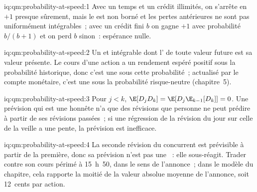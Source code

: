 \begin{solution}{iq:qm:probability-at-speed:1}
Avec un temps et un crédit illimités, on s'arrête en $+1$ presque sûrement, mais le  est
non borné et les pertes antérieures ne sont pas uniformément intégrables~; avec un crédit fini $b$
on gagne $+1$ avec probabilité $b/(b+1)$ et on perd $b$ sinon~: espérance nulle.
\end{solution}

\begin{solution}{iq:qm:probability-at-speed:2}
Un  et intégrable dont l' de toute valeur future est sa
valeur présente. Le cours d'une action a un rendement espéré positif sous la probabilité historique,
donc c'est une  sous cette probabilité~; actualisé par le compte monétaire, c'est une 
sous la probabilité risque-neutre (chapitre~5).
\end{solution}

\begin{solution}{iq:qm:probability-at-speed:3}
Pour $j < k$, $\E[D_jD_k] = \E[D_j\E_{k-1}[D_k]] = 0$. Une prévision qui est une  honnête
n'a que des révisions que personne ne peut prédire à partir de ses révisions passées~; si une régression
de la révision du jour sur celle de la veille a une pente, la prévision est inefficace.
\end{solution}

\begin{solution}{iq:qm:probability-at-speed:4}
La seconde révision du concurrent est prévisible à partir de la première, donc sa prévision n'est pas une
~: elle sous-réagit. Trader contre son cours périmé à 15~h~50, dans le sens
de l'annonce~; dans le modèle du chapitre, cela rapporte la moitié de la valeur absolue moyenne de l'annonce, soit 12~cents par action.
\end{solution}

